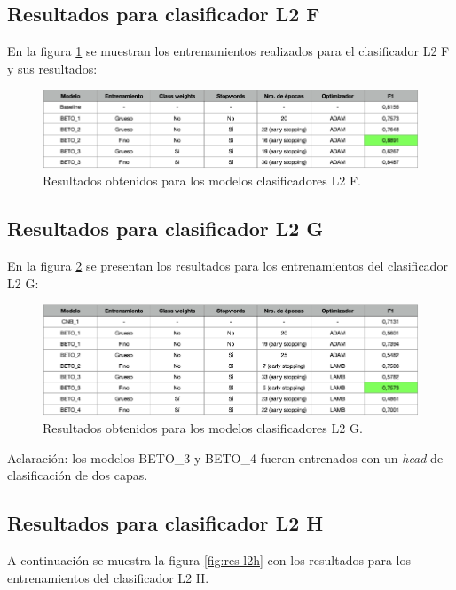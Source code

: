 \subsection{Resultados para clasificador L2 F}

En la figura \ref{fig:res-l2f} se muestran los entrenamientos realizados para el clasificador L2 F y sus resultados:

\begin{figure}[H]
	\centering
	\includegraphics[width=1\textwidth]{./Figures/cap4-resultados-l2f.png}
	\caption{Resultados obtenidos para los modelos clasificadores L2 F.}
	\label{fig:res-l2f}
\end{figure}

\subsection{Resultados para clasificador L2 G}

En la figura \ref{fig:res-l2g} se presentan los resultados para los entrenamientos del clasificador L2 G:

\begin{figure}[htbp]
	\centering
	\includegraphics[width=1\textwidth]{./Figures/cap4-resultados-l2g.png}
	\caption{Resultados obtenidos para los modelos clasificadores L2 G.}
	\label{fig:res-l2g}
\end{figure}

Aclaración: los modelos BETO\_3 y BETO\_4 fueron entrenados con un \textit{head} de clasificación de dos capas.

\subsection{Resultados para clasificador L2 H}

A continuación se muestra la figura \ref{fig:res-l2h} con los resultados para los entrenamientos del clasificador L2 H.

